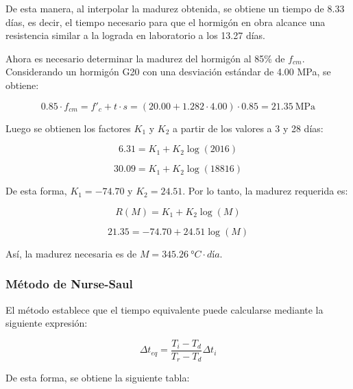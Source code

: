 De esta manera, al interpolar la madurez obtenida, se obtiene un tiempo de 8.33 días, es decir, el tiempo necesario para que el hormigón en obra alcance una resistencia similar a la lograda en laboratorio a los 13.27 días.

Ahora es necesario determinar la madurez del hormigón al 85\% de $f_{cm}$. Considerando un hormigón G20 con una desviación estándar de 4.00 MPa, se obtiene:

\begin{equation}
    0.85 \cdot f_{cm} = f'_c + t \cdot s = (20.00 + 1.282 \cdot 4.00)\cdot 0.85 = 21.35\ \text{MPa}
\end{equation}

Luego se obtienen los factores $K_1$ y $K_2$ a partir de los valores a 3 y 28 días:

\begin{equation}
    6.31 = K_1 + K_2 \log(2016)
\end{equation}

\begin{equation}
    30.09 = K_1 + K_2 \log(18816)
\end{equation}

De esta forma, $K_1 = -74.70$ y $K_2 = 24.51$. Por lo tanto, la madurez requerida es:

\begin{equation}
    R(M) = K_1 + K_2 \log(M)
\end{equation}

\begin{equation}
    21.35 = -74.70 + 24.51 \log(M)
\end{equation}

\noindent Así, la madurez necesaria es de $M = 345.26\ °C\cdot día$.

\subsubsection*{Método de Nurse-Saul}

El método establece que el tiempo equivalente puede calcularse mediante la siguiente expresión:

\begin{equation}
    \Delta t_{eq} = \frac{T_i - T_d}{T_r - T_d} \Delta t_i
\end{equation}

De esta forma, se obtiene la siguiente tabla:

